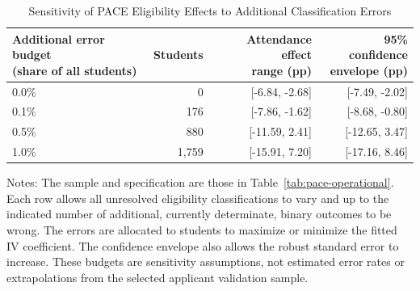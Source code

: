 \begin{table}[!htbp]
\centering
\caption{Sensitivity of PACE Eligibility Effects to Additional Classification Errors}
\label{tab:pace-classification-stress}
\small
\begin{tabular}{lrrr}
\toprule
\makecell{Additional error budget\\(share of all students)} & Students & \makecell{Attendance effect\\range (pp)} & \makecell{95\% confidence\\envelope (pp)} \\
\midrule
0.0\% & 0 & [-6.84, -2.68] & [-7.49, -2.02] \\[4pt]
0.1\% & 176 & [-7.86, -1.62] & [-8.68, -0.80] \\[4pt]
0.5\% & 880 & [-11.59, 2.41] & [-12.65, 3.47] \\[4pt]
1.0\% & 1,759 & [-15.91, 7.20] & [-17.16, 8.46] \\[4pt]
\bottomrule
\end{tabular}
\par\vspace{0.2cm}
\begin{minipage}{\textwidth}\footnotesize
Notes: The sample and specification are those in Table~\ref{tab:pace-operational}. Each row allows all unresolved eligibility classifications to vary and up to the indicated number of additional, currently determinate, binary outcomes to be wrong. The errors are allocated to students to maximize or minimize the fitted IV coefficient. The confidence envelope also allows the robust standard error to increase. These budgets are sensitivity assumptions, not estimated error rates or extrapolations from the selected applicant validation sample.
\end{minipage}
\end{table}
